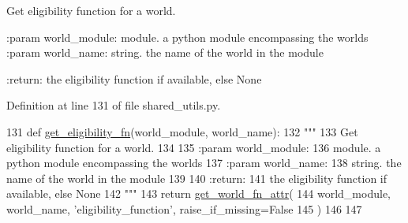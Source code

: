 \begin{DoxyVerb}Get eligibility function for a world.

:param world_module:
    module. a python module encompassing the worlds
:param world_name:
    string. the name of the world in the module

:return:
    the eligibility function if available, else None
\end{DoxyVerb}
 

Definition at line 131 of file shared\+\_\+utils.\+py.


\begin{DoxyCode}
131 \textcolor{keyword}{def }\hyperlink{namespaceparlai_1_1chat__service_1_1services_1_1messenger_1_1shared__utils_a3099521db089497f3e8c976a98dff7b9}{get\_eligibility\_fn}(world\_module, world\_name):
132     \textcolor{stringliteral}{"""}
133 \textcolor{stringliteral}{    Get eligibility function for a world.}
134 \textcolor{stringliteral}{}
135 \textcolor{stringliteral}{    :param world\_module:}
136 \textcolor{stringliteral}{        module. a python module encompassing the worlds}
137 \textcolor{stringliteral}{    :param world\_name:}
138 \textcolor{stringliteral}{        string. the name of the world in the module}
139 \textcolor{stringliteral}{}
140 \textcolor{stringliteral}{    :return:}
141 \textcolor{stringliteral}{        the eligibility function if available, else None}
142 \textcolor{stringliteral}{    """}
143     \textcolor{keywordflow}{return} \hyperlink{namespaceparlai_1_1chat__service_1_1services_1_1messenger_1_1shared__utils_ade421ab07be47db0333a0fac599c07ef}{get\_world\_fn\_attr}(
144         world\_module, world\_name, \textcolor{stringliteral}{'eligibility\_function'}, raise\_if\_missing=\textcolor{keyword}{False}
145     )
146 
147 
\end{DoxyCode}
\mbox{\label{namespaceparlai_1_1chat__service_1_1services_1_1messenger_1_1shared__utils_ade421ab07be47db0333a0fac599c07ef}} 
